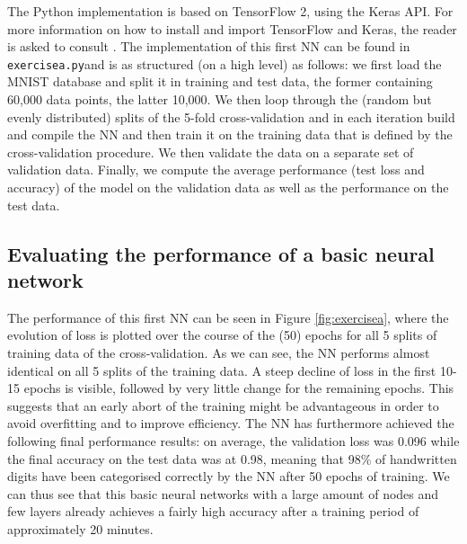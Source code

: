 \documentclass[12pt]{article}
\newcommand{\exercisea}{\texttt{exercisea.py}\;}
\begin{document}
The Python implementation is based on TensorFlow 2, using the Keras API. For more information on how to install and import TensorFlow and Keras, the reader is asked to consult \cite{Keras}. The implementation of this first NN can be found in \exercisea and is as structured (on a high level) as follows: we first load the MNIST database and split it in training and test data, the former containing 60,000 data points, the latter 10,000. We then loop through the (random but evenly distributed) splits of the 5-fold cross-validation and in each iteration build and compile the NN and then train it on the training data that is defined by the cross-validation procedure. We then validate the data on a separate set of validation data. Finally, we compute the average performance (test loss and accuracy) of the model on the validation data as well as the performance on the test data.  

\subsection{Evaluating the performance of a basic neural network}\label{sec:b}
The performance of this first NN can be seen in Figure \ref{fig:exercisea}, where the evolution of loss is plotted over the course of the (50) epochs for all 5 splits of training data of the cross-validation. As we can see, the NN performs almost identical on all 5 splits of the training data. A steep decline of loss in the first 10-15 epochs is visible, followed by very little change for the remaining epochs. This suggests that an early abort of the training might be advantageous in order to avoid overfitting and to improve efficiency. The NN has furthermore achieved the following final performance results: on average, the validation loss was 0.096 while the final accuracy on the test data was at 0.98, meaning that 98\% of handwritten digits have been categorised correctly by the NN after 50 epochs of training. We can thus see that this basic neural networks with a large amount of nodes and few layers already achieves a fairly high accuracy after a training period of approximately 20 minutes. 
\end{document}
